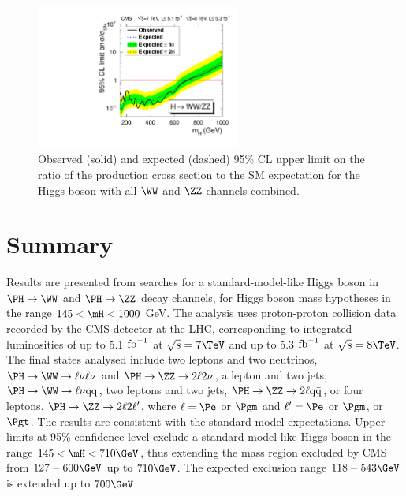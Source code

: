 \begin{figure}[htbp`]
  \centering
  \includegraphics[width=0.6\textwidth]{figures/CombinedLimit.pdf}
  \caption{\label{fig:combined}Observed (solid) and expected
  (dashed) 95\% CL upper limit on the ratio of the production cross
  section to the SM expectation for the Higgs boson with all $\WW$ and $\ZZ$
  channels combined.}
\end{figure}


\section{Summary}
\label{sec:summary}

Results are presented from searches for a standard-model-like Higgs boson in $\PH \to \WW$ and $\PH \to \ZZ$
decay channels, for Higgs boson mass hypotheses in the range $145 < \mH < 1000$ GeV. The analysis uses proton-proton 
collision data recorded by the CMS detector at the LHC, corresponding to integrated luminosities of up to
 5.1 ${\rm fb}^{-1}$ at 
$\sqrt{s} = 7\TeV$ and up to 5.3 ${\rm fb}^{-1}$ at $\sqrt{s} = 8\TeV$. The final states analysed include
two leptons and two neutrinos, $\PH \to \WW \to \ell\nu\ell\nu$ and $\PH \to \ZZ \to 2\ell 2\nu$, a lepton and two jets, 
$\PH \to \WW \to \ell \nu \mathrm{qq}$, two leptons and two jets, $\PH \to \ZZ \to 2\ell \mathrm{q\bar{q}}$,
or four leptons, $\PH \to \ZZ \to 2\ell 2\ell '$, where $\ell = \Pe$ or $\Pgm$ and $\ell ' = \Pe$ or $\Pgm$, or $\Pgt$.
The results  are consistent with the standard model expectations. 
Upper limits at 95\% confidence level exclude a standard-model-like Higgs boson in the range $145 < \mH <  710\GeV$, thus extending the  
mass region excluded by CMS from
$127-600\GeV$ up to $710\GeV$.  
The expected exclusion range $118-543\GeV$ is extended up to $700\GeV$.


